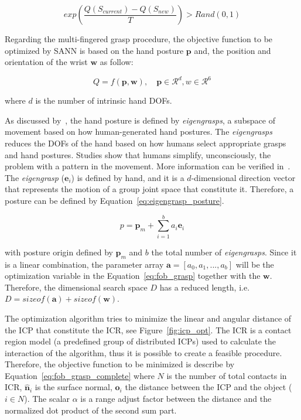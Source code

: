 \begin{equation}
exp({\frac{Q(S_{current})-Q(S_{new})}{T}})>Rand(0,1)
\label{eq:very_fast_snn_prob}
\end{equation}

Regarding the multi-fingered grasp procedure, the objective function to be optimized by \ac{SANN} is based on the hand posture $\mathbf{p}$ and, the position and orientation of the wrist $\mathbf{w}$ as follow:

\begin{equation}
Q=f(\mathbf{p}, \mathbf{w}), \quad \mathbf{p} \in \mathcal{R}^{d}, w \in \mathcal{R}^{6}
\label{eq:fob_grasp}
\end{equation}

\noindent
where $d$ is the number of intrinsic hand \acp{DOF}.

As discussed by~\cite{Ciocarlie2009}, the hand posture is defined by \textit{eigengrasps}, a subspace of movement based on how human-generated hand postures. The \textit{eigengrasps} reduces the DOFs of the hand based on how humans select appropriate grasps and hand postures. Studies show that humans simplify, unconsciously, the problem with a pattern in the movement. More information can be verified in~\cite{Ciocarlie2009,Santello2002}. The \textit{eigengrasp} ($\mathbf{e}_i$) is defined by hand, and it is a $d$-dimensional direction vector that represents the motion of a group joint space that constitute it. Therefore, a posture can be defined by Equation~\ref{eq:eigengrasp_posture}.

\begin{equation}
p=\mathbf{p}_m+\sum_{i=1}^{b} a_{i} \mathbf{e}_i
\label{eq:eigengrasp_posture}
\end{equation}

\noindent
with posture origin defined by $\mathbf{p}_m$ and $b$ the total number of \textit{eigengrasps}. Since it is a linear combination, the parameter array $\mathbf{a} = [a_0, a_1, ... , a_b]$  will be the optimization variable in the Equation~\ref{eq:fob_grasp} together with the $\mathbf{w}$. Therefore, the dimensional search space $D$ has a reduced length, i.e. $D = sizeof(\mathbf{a}) +  sizeof(\mathbf{w})$.

The optimization algorithm tries to minimize the linear and angular distance of the \ac{ICP} that constitute the \ac{ICR}, see Figure~\ref{fig:icp_opt}. The \ac{ICR} is a contact region model (a predefined group of distributed \acp{ICP}) used to calculate the interaction of the algorithm, thus it is possible to create a feasible procedure.
Therefore, the objective function to be minimized is describe by Equation~\ref{eq:fob_grasp_complete} where $N$ is the number of total contacts in \ac{ICR}, $\mathbf{\hat{n}}_{i}$ is the surface normal, $\mathbf{o}_{i}$ the distance between the \ac{ICP} and the object ($i \in N$). The scalar $\alpha$ is a range adjust factor between the distance and the normalized dot product of the second sum part.    

